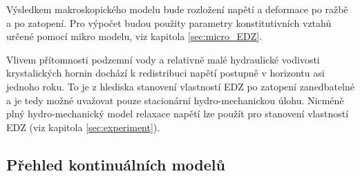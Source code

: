 \documentclass{article}
\begin{document}
Výsledkem makroskopického modelu bude rozložení napětí a deformace po ražbě a po zatopení. Pro výpočet budou použity 
parametry konstitutivních vztahů určené pomocí mikro modelu, viz kapitola \ref{sec:micro_EDZ}. 

Vlivem přítomnosti podzemní vody a relativně malé hydraulické vodivosti krystalických hornin dochází k redistribuci napětí 
postupně v horizontu asi jednoho roku. To je z hlediska stanovení vlastností EDZ po zatopení zanedbatelné a je tedy možné uvažovat 
pouze stacionární hydro-mechanickou úlohu. Nicméně plný hydro-mechanický model relaxace napětí lze použít pro stanovení vlastností EDZ (viz kapitola \ref{sec:experiment}).







\subsection{Přehled kontinuálních modelů} 
\end{document}
